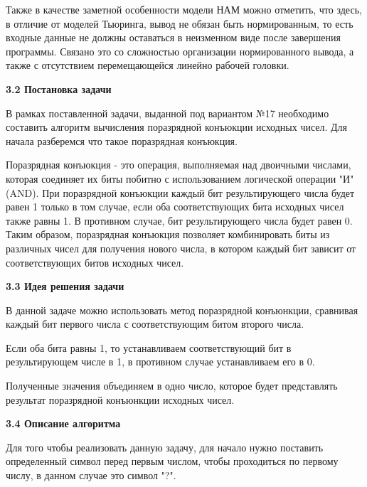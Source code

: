 \documentclass{article}
\begin{document}
\par Также в качестве заметной особенности модели НАМ можно отметить, что здесь, в отличие от моделей Тьюринга, вывод не обязан быть нормированным, то есть входные данные не должны оставаться в неизменном виде после завершения программы. Связано это со сложностью организации нормированного вывода, а также с отсутствием перемещающейся линейно рабочей головки.\\

\par \textbf{3.2 Постановка задачи}\\
\par В рамках поставленной задачи, выданной под вариантом №17 необходимо составить алгоритм вычисления поразрядной конъюкции исходных чисел. Для начала разберемся что такое поразрядная конъюкция.\\
\par Поразрядная конъюкция - это операция, выполняемая над двоичными числами, которая соединяет их биты побитно с использованием логической операции "И" (AND). При поразрядной конъюкции каждый бит результирующего числа будет равен 1 только в том случае, если оба соответствующих бита исходных чисел также равны 1. В противном случае, бит результирующего числа будет равен 0. Таким образом, поразрядная конъюкция позволяет комбинировать биты из различных чисел для получения нового числа, в котором каждый бит зависит от соответствующих битов исходных чисел.\\

\par \textbf{3.3 Идея решения задачи}\\
\par В данной задаче можно использовать метод поразрядной конъюнкции, сравнивая каждый бит первого числа с соответствующим битом второго числа.\\
\par Если оба бита равны 1, то устанавливаем соответствующий бит в результирующем числе в 1, в противном случае устанавливаем его в 0. \\
\par Полученные значения объединяем в одно число, которое будет представлять результат поразрядной конъюнкции исходных чисел.\\

\vspace{1cm}

\par \textbf{3.4 Описание алгоритма}\\
\par Для того чтобы реализовать данную задачу, для начало нужно поставить определенный символ перед первым числом, чтобы проходиться по первому числу, в данном случае это символ "?".\\
\end{document}
